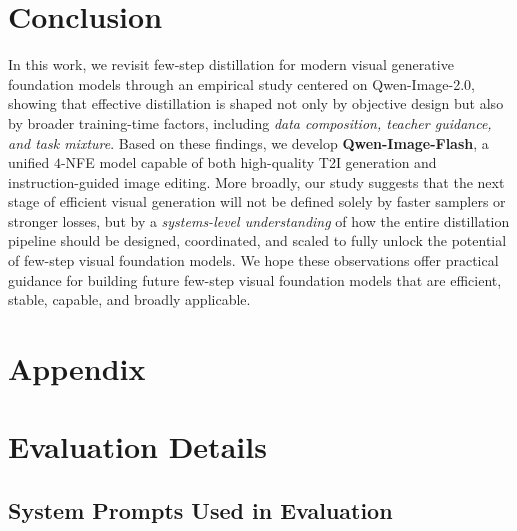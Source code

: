 \documentclass{article}
\begin{document}
\section{Conclusion}
In this work, we revisit few-step distillation for modern visual generative foundation models through an empirical study centered on Qwen-Image-2.0, showing that effective distillation is shaped not only by objective design but also by broader training-time factors, including \textit{data composition, teacher guidance, and task mixture}. Based on these findings, we develop \textbf{Qwen-Image-Flash}, a unified $4$-NFE model capable of both high-quality T2I generation and instruction-guided image editing. More broadly, our study suggests that the next stage of efficient visual generation will not be defined solely by faster samplers or stronger losses, but by a \textit{systems-level understanding} of how the entire distillation pipeline should be designed, coordinated, and scaled to fully unlock the potential of few-step visual foundation models. We hope these observations offer practical guidance for building future few-step visual foundation models that are efficient, stable, capable, and broadly applicable.





{}


\clearpage
\appendix

{}
\section*{Appendix}

\renewcommand{\thefigure}{\Alph{figure}}
\renewcommand{\thetable}{\Alph{table}}
\setcounter{figure}{0}
\setcounter{table}{0}

\section{Evaluation Details}
\label{app:evaluation_details}

\subsection{System Prompts Used in Evaluation}
\label{app:system_prompts}
\end{document}
